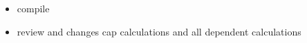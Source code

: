\begin{itemize}
    \item compile
    \item review and changes cap calculations and all dependent calculations
\end{itemize}
